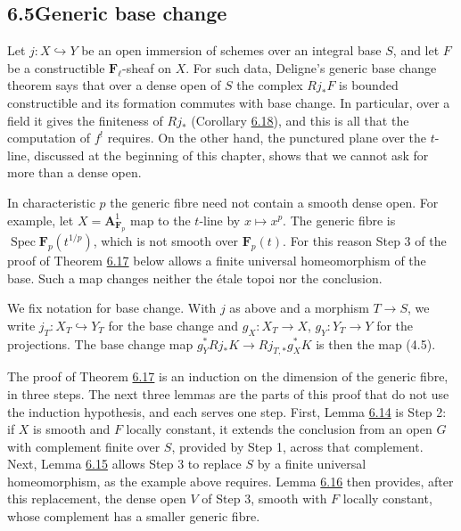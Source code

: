 \documentclass[11pt]{article}
\providecommand{\Fell}{}\renewcommand{\Fell}{\mathbf F_\ell}
\begin{document}
\subsection*{\texorpdfstring{6.5\quad Generic base change}{6.5 Generic base change}}
\label{bp555}%
\label{bp556}%
Let \(j:X\hookrightarrow Y\) be an open immersion of schemes over an integral base \(S\), and let \(F\) be a constructible \(\Fell\)-sheaf on \(X\). For such data, Deligne's generic base change theorem says that over a dense open of \(S\) the complex \(Rj_*F\) is bounded constructible and its formation commutes with base change. In particular, over a field it gives the finiteness of \(Rj_*\) (Corollary \hyperref[bp566]{6.18}), and this is all that the computation of \(f^!\) requires. On the other hand, the punctured plane over the \(t\)-line, discussed at the beginning of this chapter, shows that we cannot ask for more than a dense open.

In characteristic \(p\) the generic fibre need not contain a smooth dense open. For example, let \(X=\mathbf A^1_{\mathbf F_p}\) map to the \(t\)-line by \(x\mapsto x^p\). The generic fibre is \(\operatorname{Spec}\mathbf F_p(t^{1/p})\), which is not smooth over \(\mathbf F_p(t)\). For this reason Step 3 of the proof of Theorem \hyperref[bp563]{6.17} below allows a finite universal homeomorphism of the base. Such a map changes neither the étale topoi nor the conclusion.

We fix notation for base change. With \(j\) as above and a morphism \(T\to S\), we write \(j_T:X_T\hookrightarrow Y_T\) for the base change and \(g_X:X_T\to X\), \(g_Y:Y_T\to Y\) for the projections. The base change map \(g_Y^*Rj_*K\to Rj_{T,*}g_X^*K\) is then the map (4.5).

The proof of Theorem \hyperref[bp563]{6.17} is an induction on the dimension of the generic fibre, in three steps. The next three lemmas are the parts of this proof that do not use the induction hypothesis, and each serves one step. First, Lemma \hyperref[bp557]{6.14} is Step 2: if \(X\) is smooth and \(F\) locally constant, it extends the conclusion from an open \(G\) with complement finite over \(S\), provided by Step 1, across that complement. Next, Lemma \hyperref[bp559]{6.15} allows Step 3 to replace \(S\) by a finite universal homeomorphism, as the example above requires. Lemma \hyperref[bp561]{6.16} then provides, after this replacement, the dense open \(V\) of Step 3, smooth with \(F\) locally constant, whose complement has a smaller generic fibre.
\end{document}
